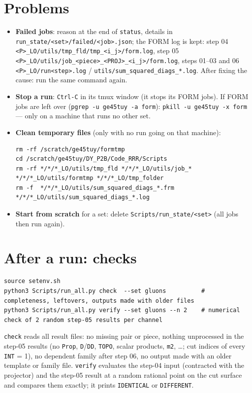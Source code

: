 \documentclass[10pt]{article}
\newcommand{\cmd}[1]{\texttt{#1}}
\begin{document}
\section{Problems}
\begin{itemize}
\item \textbf{Failed jobs}: reason at the end of \cmd{status}, details in \cmd{run\_state/<set>/failed/<job>.json};
  the FORM log is kept: step 04 \cmd{<P>\_LO/utils/tmp\_fld/tmp\_<i\_j>/form.log}, step 05
  \cmd{<P>\_LO/utils/job\_<piece>\_<PROJ>\_<i\_j>/form.log}, steps 01--03 and 06 \cmd{<P>\_LO/run<step>.log} /
  \cmd{utils/sum\_squared\_diags\_*.log}. After fixing the cause: run the same command again.
\item \textbf{Stop a run}: \cmd{Ctrl-C} in its tmux window (it stops its FORM jobs). If FORM jobs are left over
  (\cmd{pgrep -u ge45tuy -a form}): \cmd{pkill -u ge45tuy -x form} --- only on a machine that runs no other set.
\item \textbf{Clean temporary files} (only with no run going on that machine):
\begin{lstlisting}
rm -rf /scratch/ge45tuy/formtmp
cd /scratch/ge45tuy/DY_P2B/Code_RRR/Scripts
rm -rf */*/*_LO/utils/tmp_fld */*/*_LO/utils/job_* */*/*_LO/utils/formtmp */*/*_LO/tmp_folder
rm -f  */*/*_LO/utils/sum_squared_diags_*.frm */*/*_LO/utils/sum_squared_diags_*.log
\end{lstlisting}
\item \textbf{Start from scratch} for a set: delete \cmd{Scripts/run\_state/<set>} (all jobs then run again).
\end{itemize}

\section{After a run: checks}
\begin{lstlisting}
source setenv.sh
python3 Scripts/run_all.py check  --set gluons          # completeness, leftovers, outputs made with older files
python3 Scripts/run_all.py verify --set gluons --n 2    # numerical check of 2 random step-05 results per channel
\end{lstlisting}
\cmd{check} reads all result files: no missing pair or piece, nothing unprocessed in the step-05 results (no
\cmd{Prop}, \cmd{D}/\cmd{DD}, \cmd{TOPO}, scalar products, \cmd{m2}, \ldots; cut indices of every \cmd{INT} = 1), no
dependent family after step 06, no output made with an older template or family file.
\cmd{verify} evaluates the step-04 input (contracted with the projector) and the step-05 result at a random rational
point on the cut surface and compares them exactly; it prints \cmd{IDENTICAL} or \cmd{DIFFERENT}.
\end{document}
